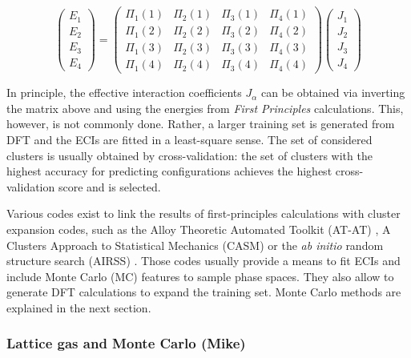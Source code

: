 \documentclass[../main.tex]{subfiles}
\begin{document}
\begin{equation}
{\left( \begin{array}{cccc}
{E_1}\\
{E_2}\\
{E_3}\\
{E_4}
\end{array}\right)}=
{\left( \begin{array}{cccc}
{\Pi_1}(1) & {\Pi_2}(1) & {\Pi_3}(1) & {\Pi_4}(1) \\
{\Pi_1}(2) & {\Pi_2}(2) & {\Pi_3}(2) & {\Pi_4}(2)  \\
{\Pi_1}(3) & {\Pi_2}(3) & {\Pi_3}(3) & {\Pi_4}(3)  \\
{\Pi_1}(4) & {\Pi_2}(4) & {\Pi_3}(4) & {\Pi_4}(4) 
\end{array}\right)}
{\left(\begin{array}{cccc}
{J_1}\\
{J_2}\\
{J_3}\\
{J_4}
\end{array}\right)}
\end{equation}

In principle, the effective interaction coefficients $J_\alpha$ can be obtained via inverting the matrix above and using the energies from \textit{First Principles} calculations. This, however, is not commonly done. Rather, a larger training set is generated from DFT and the ECIs are fitted in a least-square sense. The set of considered clusters is usually obtained by cross-validation: the set of clusters with the highest accuracy for predicting configurations achieves the highest cross-validation score and is selected.

Various codes exist to link the results of first-principles calculations with cluster expansion codes, such as the Alloy Theoretic Automated Toolkit (AT-AT) \cite{avdw:atat2,avdw:atat,avdw:maps},  A Clusters Approach to Statistical Mechanics (CASM) \cite{natarajan2017} or the \textit{ab initio} random structure search (AIRSS) \cite{Pickard_2011}. Those codes usually provide a means to fit ECIs and include Monte Carlo (MC) features to sample phase spaces. They also allow to generate DFT calculations to expand the training set. Monte Carlo methods are explained in the next section.

\subsubsection{Lattice gas and Monte Carlo (Mike)}
\label{sec:monte_carlo}
\end{document}

